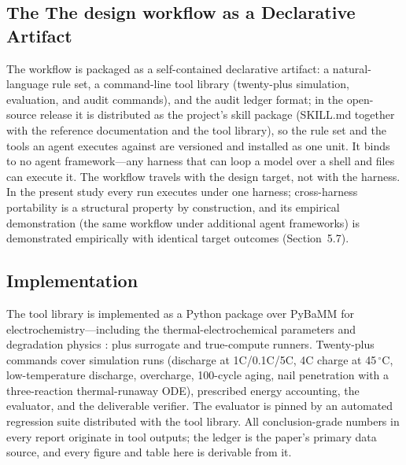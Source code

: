 \subsection{The The design workflow as a Declarative Artifact}

The workflow is packaged as a self-contained declarative artifact: a
natural-language rule set, a command-line tool library (twenty-plus
simulation, evaluation, and audit commands), and the audit ledger format;
in the open-source release it is distributed as the project's skill
package (SKILL.md together with the reference documentation and the tool
library), so the rule set and the tools an agent executes against are
versioned and installed as one unit.
It binds to no agent framework---any harness that can loop a model over a
shell and files can execute it. The workflow travels with the design target,
not with the harness. In the present study every run executes under one
harness; cross-harness portability is a structural property by
construction, and its empirical demonstration (the same workflow under
additional agent frameworks) is demonstrated empirically with identical target outcomes (Section~5.7).

\subsection{Implementation}

The tool library is implemented as a Python package over PyBaMM
\cite{sulzer2021pybamm} for electrochemistry---including the
thermal-electrochemical parameters \cite{oregan2022electrochim} and
degradation physics \cite{okane2022pccp, peled1979sei,
arora1999plating, ren2018plating, wang2012thermalrunaway}: plus surrogate
and true-compute runners. Twenty-plus commands cover simulation runs
(discharge at 1C/0.1C/5C, 4C charge at 45\,$^\circ$C, low-temperature
discharge, overcharge, 100-cycle aging, nail penetration with a
three-reaction thermal-runaway ODE), prescribed energy accounting, the
evaluator, and the deliverable verifier. The evaluator
is pinned by an automated regression suite distributed with the tool
library.
All conclusion-grade numbers in every report originate in tool outputs;
the ledger is the paper's primary data source, and every figure and table
here is derivable from it.
